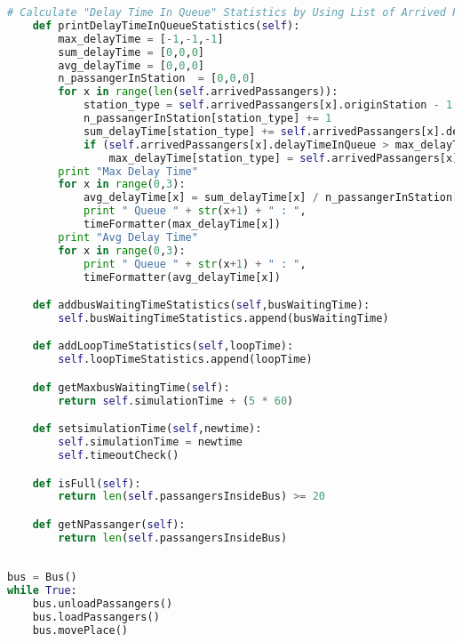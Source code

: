 \documentclass{article}
\begin{document}
\begin{lstlisting}[language=Python]
	# Calculate "Delay Time In Queue" Statistics by Using List of Arrived Passanger
	def printDelayTimeInQueueStatistics(self):
		max_delayTime = [-1,-1,-1]
		sum_delayTime = [0,0,0]
		avg_delayTime = [0,0,0]
		n_passangerInStation  = [0,0,0]
		for x in range(len(self.arrivedPassangers)):
			station_type = self.arrivedPassangers[x].originStation - 1
			n_passangerInStation[station_type] += 1
			sum_delayTime[station_type] += self.arrivedPassangers[x].delayTimeInQueue
			if (self.arrivedPassangers[x].delayTimeInQueue > max_delayTime[station_type]):
				max_delayTime[station_type] = self.arrivedPassangers[x].delayTimeInQueue
		print "Max Delay Time"
		for x in range(0,3):
			avg_delayTime[x] = sum_delayTime[x] / n_passangerInStation[x]		
			print "	Queue " + str(x+1) + " : ",
			timeFormatter(max_delayTime[x])
		print "Avg Delay Time"
		for x in range(0,3):	
			print "	Queue " + str(x+1) + " : ",
			timeFormatter(avg_delayTime[x])

	def addbusWaitingTimeStatistics(self,busWaitingTime):
		self.busWaitingTimeStatistics.append(busWaitingTime)

	def addLoopTimeStatistics(self,loopTime):
		self.loopTimeStatistics.append(loopTime)

	def getMaxbusWaitingTime(self):
		return self.simulationTime + (5 * 60)

	def setsimulationTime(self,newtime):
		self.simulationTime = newtime
		self.timeoutCheck()

	def isFull(self):
		return len(self.passangersInsideBus) >= 20

	def getNPassanger(self):
		return len(self.passangersInsideBus)
	
		
bus = Bus()
while True:
	bus.unloadPassangers()
	bus.loadPassangers()
	bus.movePlace()

 	\end{lstlisting}
\end{document}
